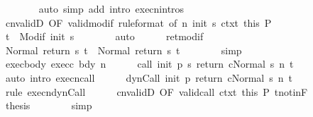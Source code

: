 \begin{isabellebody}
\ \ \ \ \ \ \isamarkupfalse%
\ {\isacharparenleft}auto\ simp\ add{\isacharcolon}\ intro{\isacharcolon}\ execn{\isachardot}intros{\isacharparenright}\isanewline
\ \ \ \ \isamarkupfalse%
\ cnvalidD\ {\isacharbrackleft}OF\ valid{\isacharunderscore}modif{\isacharprime}\ {\isacharbrackleft}rule{\isacharunderscore}format{\isacharcomma}\ of\ n\ {\isachardoublequoteopen}init\ s{\isachardoublequoteclose}{\isacharbrackright}\ ctxt{\isacharprime}\ this{\isacharbrackright}\ P\isanewline
\ \ \ \ \isamarkupfalse%
\ {\isachardoublequoteopen}t{\isacharprime}\ {\isasymin}\ Modif\ {\isacharparenleft}init\ s{\isacharparenright}{\isachardoublequoteclose}\isanewline
\ \ \ \ \ \ \isamarkupfalse%
\ auto\isanewline
\ \ \ \ \isamarkupfalse%
\ ret{\isacharunderscore}modif\ \isamarkupfalse%
\ {\isachardoublequoteopen}Normal\ {\isacharparenleft}return{\isacharprime}\ s\ t{\isacharprime}{\isacharparenright}\ {\isacharequal}\ Normal\ {\isacharparenleft}return\ s\ t{\isacharprime}{\isacharparenright}{\isachardoublequoteclose}\isanewline
\ \ \ \ \ \ \isamarkupfalse%
\ simp\isanewline
\ \ \ \ \isamarkupfalse%
\ exec{\isacharunderscore}body\ exec{\isacharunderscore}c\ bdy\ n\isanewline
\ \ \ \ \isamarkupfalse%
\ {\isachardoublequoteopen}{\isasymGamma}{\isasymturnstile}{\isasymlangle}call\ init\ {\isacharparenleft}p\ s{\isacharparenright}\ return{\isacharprime}\ c{\isacharcomma}Normal\ s{\isasymrangle}\ {\isacharequal}n{\isasymRightarrow}\ t{\isachardoublequoteclose}\ \isanewline
\ \ \ \ \ \ \isamarkupfalse%
\ {\isacharparenleft}auto\ intro{\isacharcolon}\ execn{\isacharunderscore}call{\isacharparenright}\isanewline
\ \ \ \ \isamarkupfalse%
\ {\isachardoublequoteopen}{\isasymGamma}{\isasymturnstile}{\isasymlangle}dynCall\ init\ p\ return{\isacharprime}\ c{\isacharcomma}Normal\ s{\isasymrangle}\ {\isacharequal}n{\isasymRightarrow}\ t{\isachardoublequoteclose}\ \isanewline
\ \ \ \ \ \ \isamarkupfalse%
\ {\isacharparenleft}rule\ execn{\isacharunderscore}dynCall{\isacharparenright}\isanewline
\ \ \ \ \isamarkupfalse%
\ cnvalidD\ {\isacharbrackleft}OF\ valid{\isacharunderscore}call\ ctxt\ this{\isacharbrackright}\ P\ t{\isacharunderscore}notin{\isacharunderscore}F\isanewline
\ \ \ \ \isamarkupfalse%
\ {\isacharquery}thesis\isanewline
\ \ \ \ \ \ \isamarkupfalse%
\ simp\isanewline
\ \ \isamarkupfalse%
\isanewline
\ \ \ \ \isamarkupfalse%

\end{isabellebody}
